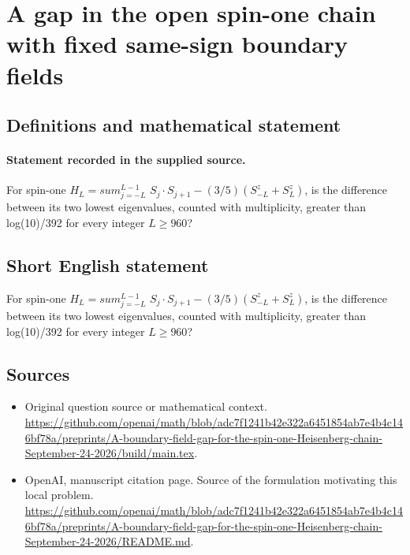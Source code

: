 \documentclass[11pt]{article}
\begin{document}
\section*{A gap in the open spin-one chain with fixed same-sign boundary fields}\label{statement}
\subsection{Definitions and mathematical statement}
\paragraph{Statement recorded in the supplied source.}
For spin-one $H_L=sum_{j=-L}^{L-1}$ $S_j\cdot S_{j+1}-(3/5)(S_{-L}^z+S_L^z)$, is the difference between its two lowest eigenvalues, counted with multiplicity, greater than log(10)/392 for every integer $L\geq 960$?
\subsection{Short English statement}
For spin-one $H_L=sum_{j=-L}^{L-1}$ $S_j\cdot S_{j+1}-(3/5)(S_{-L}^z+S_L^z)$, is the difference between its two lowest eigenvalues, counted with multiplicity, greater than log(10)/392 for every integer $L\geq 960$?
\subsection{Sources}
\begin{itemize}
\item[S1] Original question source or mathematical context.
\url{https://github.com/openai/math/blob/adc7f1241b42e322a6451854ab7e4b4c146bf78a/preprints/A-boundary-field-gap-for-the-spin-one-Heisenberg-chain-September-24-2026/build/main.tex}.
\item[S2] OpenAI, manuscript citation page. Source of the formulation motivating this local problem.
\url{https://github.com/openai/math/blob/adc7f1241b42e322a6451854ab7e4b4c146bf78a/preprints/A-boundary-field-gap-for-the-spin-one-Heisenberg-chain-September-24-2026/README.md}.
\end{itemize}
\end{document}
